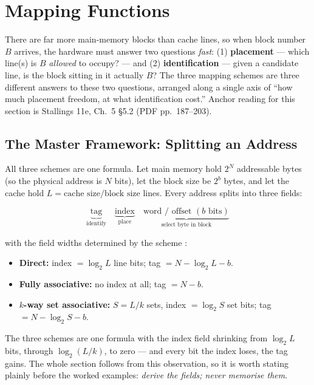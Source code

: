 \documentclass[11pt]{article}
\begin{document}
\section{Mapping Functions}
\label{sec:mapping}

There are far more main-memory blocks than cache lines, so when block number $B$ arrives, the hardware must answer two questions \emph{fast}: (1) \textbf{placement} --- which line(s) is $B$ \emph{allowed} to occupy? --- and (2) \textbf{identification} --- given a candidate line, is the block sitting in it actually $B$? The three mapping schemes are three different answers to these two questions, arranged along a single axis of ``how much placement freedom, at what identification cost.'' Anchor reading for this section is Stallings 11e, Ch.~5 \S5.2 (PDF pp.~187--203).

\subsection{The Master Framework: Splitting an Address}

All three schemes are one formula. Let main memory hold $2^N$ addressable bytes (so the physical address is $N$ bits), let the block size be $2^b$ bytes, and let the cache hold $L = \text{cache size} / \text{block size}$ lines. Every address splits into three fields:

\[
  \underbrace{\text{tag}}_{\text{identify}}\quad
  \underbrace{\text{index}}_{\text{place}}\quad
  \underbrace{\text{word / offset } (b \text{ bits})}_{\text{select byte in block}}
\]

with the field widths determined by the scheme \cite[\S5.2, PDF pp.~187--203]{Stallings2015_computer_organization}:

\begin{itemize}
  \item \textbf{Direct:} index $=\log_2 L$ line bits; tag $= N - \log_2 L - b$.
  \item \textbf{Fully associative:} no index at all; tag $= N - b$.
  \item \textbf{$k$-way set associative:} $S = L/k$ sets, index $=\log_2 S$ set bits; tag $= N - \log_2 S - b$.
\end{itemize}

The three schemes are one formula with the index field shrinking from $\log_2 L$ bits, through $\log_2(L/k)$, to zero --- and every bit the index loses, the tag gains. The whole section follows from this observation, so it is worth stating plainly before the worked examples: \emph{derive the fields; never memorise them}.
\end{document}
